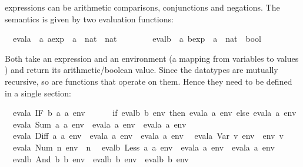 \begin{isabellebody}
\begin{isamarkuptext}
expressions can be arithmetic comparisons, conjunctions and negations.
The semantics is given by two evaluation functions:%
\end{isamarkuptext}%
\isamarkuptrue%
\ \ evala\ {\isacharcolon}{\isacharcolon}\ {\isachardoublequote}{\isacharprime}a\ aexp\ {\isasymRightarrow}\ {\isacharparenleft}{\isacharprime}a\ {\isasymRightarrow}\ nat{\isacharparenright}\ {\isasymRightarrow}\ nat{\isachardoublequote}\isanewline
\ \ \ \ \ \ \ \ evalb\ {\isacharcolon}{\isacharcolon}\ {\isachardoublequote}{\isacharprime}a\ bexp\ {\isasymRightarrow}\ {\isacharparenleft}{\isacharprime}a\ {\isasymRightarrow}\ nat{\isacharparenright}\ {\isasymRightarrow}\ bool{\isachardoublequote}\isamarkupfalse%
%
\begin{isamarkuptext}%
\noindent
Both take an expression and an environment (a mapping from variables  to values
) and return its arithmetic/boolean
value. Since the datatypes are mutually recursive, so are functions that
operate on them. Hence they need to be defined in a single 
section:%
\end{isamarkuptext}%
\isamarkuptrue%
\isanewline
\ \ {\isachardoublequote}evala\ {\isacharparenleft}IF\ b\ a{}\ a{}{\isacharparenright}\ env\ {\isacharequal}\isanewline
\ \ \ \ \ {\isacharparenleft}if\ evalb\ b\ env\ then\ evala\ a{}\ env\ else\ evala\ a{}\ env{\isacharparenright}{\isachardoublequote}\isanewline
\ \ {\isachardoublequote}evala\ {\isacharparenleft}Sum\ a{}\ a{}{\isacharparenright}\ env\ {\isacharequal}\ evala\ a{}\ env\ {\isacharplus}\ evala\ a{}\ env{\isachardoublequote}\isanewline
\ \ {\isachardoublequote}evala\ {\isacharparenleft}Diff\ a{}\ a{}{\isacharparenright}\ env\ {\isacharequal}\ evala\ a{}\ env\ {\isacharminus}\ evala\ a{}\ env{\isachardoublequote}\isanewline
\ \ {\isachardoublequote}evala\ {\isacharparenleft}Var\ v{\isacharparenright}\ env\ {\isacharequal}\ env\ v{\isachardoublequote}\isanewline
\ \ {\isachardoublequote}evala\ {\isacharparenleft}Num\ n{\isacharparenright}\ env\ {\isacharequal}\ n{\isachardoublequote}\isanewline
\isanewline
\ \ {\isachardoublequote}evalb\ {\isacharparenleft}Less\ a{}\ a{}{\isacharparenright}\ env\ {\isacharequal}\ {\isacharparenleft}evala\ a{}\ env\ {\isacharless}\ evala\ a{}\ env{\isacharparenright}{\isachardoublequote}\isanewline
\ \ {\isachardoublequote}evalb\ {\isacharparenleft}And\ b{}\ b{}{\isacharparenright}\ env\ {\isacharequal}\ {\isacharparenleft}evalb\ b{}\ env\ {\isasymand}\ evalb\ b{}\ env{\isacharparenright}{\isachardoublequote}\isanewline

\end{isabellebody}
